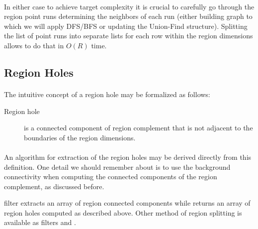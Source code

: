 \paragraph*{}
In either case to achieve target complexity it is crucial to carefully go through the region point runs determining the neighbors of each run (either building graph to which we will apply DFS/BFS or updating the Union-Find structure). Splitting the list of point runs into separate lists for each row within the region dimensions allows to do that in $O(R)$ time.

\subsection{Region Holes}

\paragraph*{}
The intuitive concept of a region hole may be formalized as follows:

\begin{description}
	\item[Region hole] is a connected component of region complement that is not adjacent to the boundaries of the region dimensions.
\end{description}

\paragraph*{}
An algorithm for extraction of the region holes may be derived directly from this definition. One detail we should remember about is to use the background connectivity when computing the connected components of the region complement, as discussed before. 

\begin{refImpl}
\studio filter  extracts an array of region connected components while  returns an array of region holes computed as described above. Other method of region splitting is available as filters  and .
\end{refImpl}